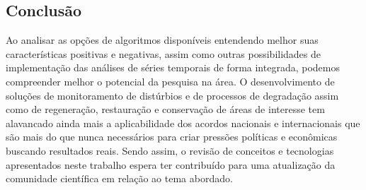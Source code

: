 \subsection{Conclusão}
\hspace{13pt} Ao analisar as opções de algoritmos disponíveis entendendo melhor suas características positivas e negativas, assim como outras possibilidades de implementação das análises de séries temporais de forma integrada, podemos compreender melhor o potencial da pesquisa na área. O desenvolvimento de soluções de monitoramento de distúrbios e de processos de degradação assim como de regeneração, restauração e conservação de áreas de interesse tem alavancado ainda mais a aplicabilidade dos acordos nacionais e internacionais que são mais do que nunca necessários para criar pressões políticas e econômicas buscando resultados reais. Sendo assim, o revisão de conceitos e tecnologias apresentados neste trabalho espera ter contribuído para uma atualização da comunidade científica em relação ao tema abordado.